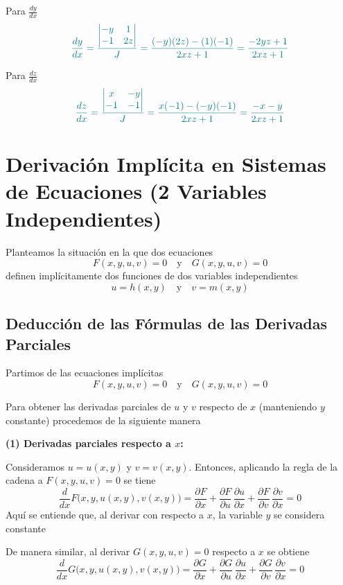 \documentclass{article}
\begin{document}
Para \( \displaystyle \frac{dy}{dx} \)
\[\color{teal}
\frac{dy}{dx} =
\frac{
\begin{vmatrix}
-y & 1 \\
-1 & 2z
\end{vmatrix}
}{J}
=
\frac{(-y)(2z) - (1)(-1)}{2xz+1}
=
\frac{-2yz+1}{2xz+1}
\]

Para \( \displaystyle \frac{dz}{dx} \)
\[\color{teal}
\frac{dz}{dx} =
\frac{
\begin{vmatrix}
x & -y \\
-1 & -1
\end{vmatrix}
}{J}
=
\frac{x(-1)-(-y)(-1)}{2xz+1}
=
\frac{-x-y}{2xz+1}
\]

\section*{Derivación Implícita en Sistemas de Ecuaciones (2 Variables Independientes)}

Planteamos la situación en la que dos ecuaciones
\[
F(x,y,u,v)=0 \quad \text{y} \quad G(x,y,u,v)=0
\]
definen implícitamente dos funciones de dos variables independientes
\[
u = h(x,y) \quad \text{y} \quad v = m(x,y)
\]

\subsection*{Deducción de las Fórmulas de las Derivadas Parciales}

Partimos de las ecuaciones implícitas
\[
F(x,y,u,v)=0 \quad \text{y} \quad G(x,y,u,v)=0
\]

Para obtener las derivadas parciales de \( u \) y \( v \) respecto de \( x \) (manteniendo \( y \) constante) procedemos de la siguiente manera

\medskip
\noindent \textbf{(1) Derivadas parciales respecto a \( x \):}

Consideramos \( u = u(x,y) \) y \( v = v(x,y) \). Entonces, aplicando la regla de la cadena a \( F(x,y,u,v)=0 \) se tiene
\[
\frac{d}{dx}F\bigl(x,y,u(x,y),v(x,y)\bigr)
=\frac{\partial F}{\partial x}+ \frac{\partial F}{\partial u}\,\frac{\partial u}{\partial x}+ \frac{\partial F}{\partial v}\,\frac{\partial v}{\partial x}=0
\]
Aquí se entiende que, al derivar con respecto a \( x \), la variable \( y \) se considera constante

De manera similar, al derivar \( G(x,y,u,v)=0 \) respecto a \( x \) se obtiene
\[
\frac{d}{dx}G\bigl(x,y,u(x,y),v(x,y)\bigr)
=\frac{\partial G}{\partial x}+ \frac{\partial G}{\partial u}\,\frac{\partial u}{\partial x}+ \frac{\partial G}{\partial v}\,\frac{\partial v}{\partial x}=0
\]
\end{document}
